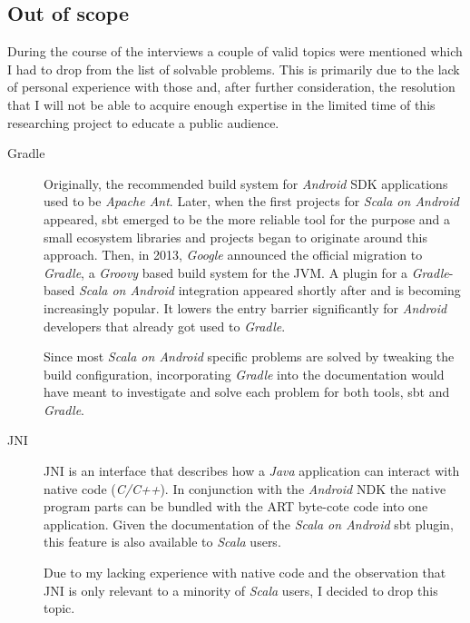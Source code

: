 \subsection{Out of scope}

During the course of the interviews a couple of valid topics were mentioned which I had to drop from the list of solvable problems. This is primarily due to the lack of personal experience with those and, after further consideration, the resolution that I will not be able to acquire enough expertise in the limited time of this researching project to educate a public audience.

\begin{description}

	\item[Gradle]\hfill

	Originally, the recommended build system for \textit{Android} \ac{SDK} applications used to be \textit{Apache Ant}. Later, when the first projects for \textit{Scala on Android} appeared, \ac{sbt} emerged to be the more reliable tool for the purpose and a small ecosystem libraries and projects began to originate around this approach. Then, in 2013, \textit{Google} announced the official migration to \textit{Gradle}, a \textit{Groovy} based build system for the \ac{JVM}. A plugin for a \textit{Gradle}-based \textit{Scala on Android} integration appeared shortly after and is becoming increasingly popular. It lowers the entry barrier significantly for \textit{Android} developers that already got used to \textit{Gradle}.

	Since most \textit{Scala on Android} specific problems are solved by tweaking the build configuration, incorporating \textit{Gradle} into the documentation would have meant to investigate and solve each problem for both tools, \ac{sbt} and \textit{Gradle}.

	\item[JNI]\hfill

	\ac{JNI} is an interface that describes how a \textit{Java} application can interact with native code (\textit{C/C++}). In conjunction with the \textit{Android} \ac{NDK} the native program parts can be bundled with the \ac{ART} byte-cote code into one application. Given the documentation of the \textit{Scala on Android} \ac{sbt} plugin, this feature is also available to \textit{Scala} users.

	Due to my lacking experience with native code and the observation that \ac{JNI} is only relevant to a minority of \textit{Scala} users, I decided to drop this topic.

\end{description}